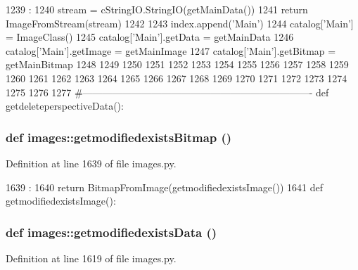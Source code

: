 \begin{DoxyCode}
1239                   :
1240     stream = cStringIO.StringIO(getMainData())
1241     return ImageFromStream(stream)
1242 
1243 index.append('Main')
1244 catalog['Main'] = ImageClass()
1245 catalog['Main'].getData = getMainData
1246 catalog['Main'].getImage = getMainImage
1247 catalog['Main'].getBitmap = getMainBitmap
1248 
1249 
1250 
1251 
1252 
1253 
1254 
1255 
1256 
1257 
1258 
1259 
1260 
1261 
1262 
1263 
1264 
1265 
1266 
1267 
1268 
1269 
1270 
1271 
1272 
1273 
1274 
1275 
1276 
1277 #----------------------------------------------------------------------
def getdeleteperspectiveData():
\end{DoxyCode}
\hypertarget{namespaceimages_a34689c0d5a3888ab0b14ffa979120783}{
\subsubsection[{getmodifiedexistsBitmap}]{\setlength{\rightskip}{0pt plus 5cm}def images::getmodifiedexistsBitmap ()}}
\label{namespaceimages_a34689c0d5a3888ab0b14ffa979120783}


Definition at line 1639 of file images.py.


\begin{DoxyCode}
1639                              :
1640     return BitmapFromImage(getmodifiedexistsImage())
1641 
def getmodifiedexistsImage():
\end{DoxyCode}
\hypertarget{namespaceimages_aa069ff65d8c53687c9358a838ce7ea58}{
\subsubsection[{getmodifiedexistsData}]{\setlength{\rightskip}{0pt plus 5cm}def images::getmodifiedexistsData ()}}
\label{namespaceimages_aa069ff65d8c53687c9358a838ce7ea58}


Definition at line 1619 of file images.py.



